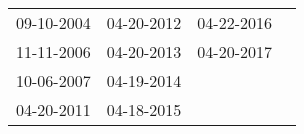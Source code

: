 \begin{supertabular}{llll}
 09-10-2004 &  04-20-2012 &  04-22-2016 \\
 11-11-2006 &  04-20-2013 &  04-20-2017 \\
 10-06-2007 &  04-19-2014 &             \\
 04-20-2011 &  04-18-2015 &             \\
\end{supertabular}
